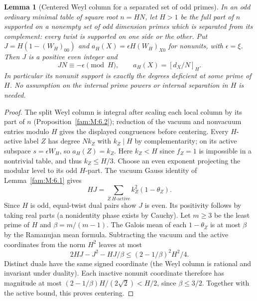 \documentclass[11pt,a4paper]{article}
\numberwithin{equation}{section}
\newtheorem{lemma}[theorem]{Lemma}
\theoremstyle{remark}
\begin{document}
\begin{lemma}[Centered Weyl column for a separated set of odd primes]\label{fam:C:2.1}\label{fam:C:n:centered}
In an odd ordinary minimal table of square root $n=HN$, let $H>1$
be the full part of $n$ supported on a nonempty set of odd dimension primes which
is separated from its complement: every twist is supported on one
side or the other. Put $J=H(1-(W_H)_{00})$ and
$a_H(X)=\epsilon H(W_H)_{X0}$ for nonunits, with $\epsilon=\xi$.
Then $J$ is a positive even integer and
\[
      JN\equiv-\epsilon\pmod H,\qquad
      a_H(X)=[d_X/N]_H.
\]
In particular its nonunit support is exactly the degrees deficient
at some prime of $H$. No assumption on the internal prime powers
or internal separation in $H$ is needed.
\end{lemma}
\begin{proof}
The split Weyl column is integral after scaling each local column
by its part of $n$ (Proposition~\ref{fam:M:6.2}); reduction of the vacuum
and nonvacuum entries modulo $H$ gives the displayed congruences
before centering. Every $H$-active label $Z$ has degree $Nk_Z$
with $k_Z\mid H$ by complementarity; on its active subspace
$s=\epsilon W_H$, so $a_H(Z)=k_Z$. Here $k_Z<H$ since $f_Z=1$
is impossible in a nontrivial table, and thus $k_Z\le H/3$.
Choose an even exponent projecting the modular level to its odd
$H$-part. The vacuum Gauss identity of Lemma~\ref{fam:M:6.1} gives
\[
               HJ=\sum_{Z\ H\text{-active}}k_Z^2(1-\theta_Z).
\]
Since $H$ is odd, equal-twist dual pairs show $J$ is even. Its
positivity follows by taking real parts (a nonidentity phase
exists by Cauchy). Let $m\ge3$ be the least prime of $H$ and
$\beta=m/(m-1)$. The Galois mean of each $1-\theta_Z$ is at most
$\beta$ by the Ramanujan mean formula. Subtracting the vacuum and
the active coordinates from the norm $H^2$ leaves at most
\[
 2HJ-J^2-HJ/\beta\le (2-1/\beta)^2H^2/4.
\]
Distinct duals have the same signed coordinate (the Weyl column
is rational and invariant under duality). Each inactive nonunit
coordinate therefore has magnitude at most
$(2-1/\beta)H/(2\sqrt2)<H/2$, since $\beta\le3/2$. Together
with the active bound, this proves centering.
\end{proof}
\end{document}
